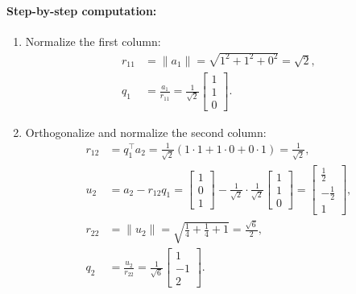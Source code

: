 \documentclass[../../main.tex]{subfiles}
\begin{document}
\paragraph{Step-by-step computation:}
\begin{enumerate}
    \item Normalize the first column:
          \begin{align*}
              r_{11} & = \|a_1\| = \sqrt{1^2 + 1^2 + 0^2} = \sqrt{2},                                       \\
              q_1    & = \frac{a_1}{r_{11}} = \frac{1}{\sqrt{2}} \begin{bmatrix} 1 \\ 1 \\ 0 \end{bmatrix}.
          \end{align*}

    \item Orthogonalize and normalize the second column:
          \begin{align*}
              r_{12} & = q_1^\top a_2 = \frac{1}{\sqrt{2}} (1 \cdot 1 + 1 \cdot 0 + 0 \cdot 1) = \frac{1}{\sqrt{2}},                                                                                                                            \\
              u_2    & = a_2 - r_{12} q_1 = \begin{bmatrix} 1 \\ 0 \\ 1 \end{bmatrix} - \frac{1}{\sqrt{2}} \cdot \frac{1}{\sqrt{2}} \begin{bmatrix} 1 \\ 1 \\ 0 \end{bmatrix} = \begin{bmatrix} \frac{1}{2} \\ -\frac{1}{2} \\ 1 \end{bmatrix}, \\
              r_{22} & = \|u_2\| = \sqrt{\frac{1}{4} + \frac{1}{4} + 1} = \frac{\sqrt{6}}{2},                                                                                                                                                   \\
              q_2    & = \frac{u_2}{r_{22}} = \frac{1}{\sqrt{6}} \begin{bmatrix} 1 \\ -1 \\ 2 \end{bmatrix}.
          \end{align*}
\end{enumerate}
\end{document}
